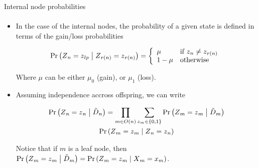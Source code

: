 \documentclass[9pt,handout,ignorenonframetext,]{beamer}
\newcommand{\Prcond}[2]{{\mbox{Pr}\left(#1\vphantom{#2}\;\right|\left.\vphantom{#1}#2\right)}}
\newcommand{\aphylo}{D{}}      %
\newcommand{\aphyloObs}{\tilde \aphylo{}} %
\newcommand{\Ann}{Z{}} %
\newcommand{\ann}{z{}} %
\newcommand{\AnnObs}{X{}}
\newcommand{\annObs}{x{}}
\begin{document}
\begin{frame}[t,label=internalnodeprob]{Internal node probabilities}

\framesubtitle{\hyperlink{peelingalgorithm}{}}

\begin{itemize}
\item
  In the case of the internal nodes, the probability of a given state is
  defined in terms of the gain/loss probabilities

  \[
  \Prcond{\Ann_{n} = \ann_{lp}}{\Ann_{r(n)} = \ann_{r(n)}} = \left\{
  \begin{array}{ll}
  \mu & \mbox{if }\ann_{n} \neq \ann_{r(n)} \\
  1 - \mu & \mbox{otherwise}
  \end{array}
  \right.
  \]

  Where \(\mu\) can be either \(\mu_0\) (gain), or \(\mu_1\) (loss).
\item
  Assuming independence accross offspring, we can write

  \begin{multline}
  \label{eq:interior1}
  \Prcond{\Ann_n = \ann_n}{\aphyloObs_n} = %
  \prod_{m \in O(n)} \sum_{\ann_m \in \{0,1\}} \Prcond{\Ann_m = \ann_m}{\aphyloObs_m} \\
  \Prcond{\Ann_{m} = \ann_{m}}{\Ann_{n} = \ann_{n}}
  \end{multline}

  Notice that if \(m\) is a leaf node, then
  \(\Prcond{\Ann_m = \ann_m}{\aphyloObs_m} = \Prcond{\Ann_m = \ann_m}{\AnnObs_m = \annObs_m}\).
\end{itemize}

\end{frame}
\end{document}
